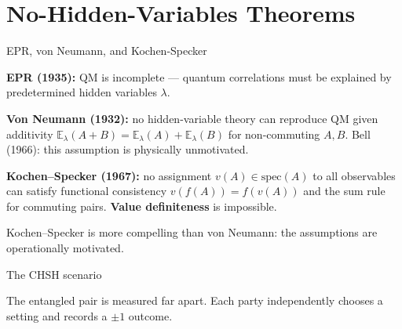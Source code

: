 \documentclass[fleql]{beamer}
\newcommand{\kw}[1]{\textbf{#1}}
\begin{document}
\section{No-Hidden-Variables Theorems}

\begin{frame}{EPR, von Neumann, and Kochen-Specker}

  \textbf{EPR (1935):} QM is incomplete --- quantum correlations
  must be explained by predetermined hidden variables $\lambda$.

  \vspace{0.5em}
  \textbf{Von Neumann (1932):} no hidden-variable theory can
  reproduce QM given additivity $\mathbb{E}_\lambda(A+B) =
  \mathbb{E}_\lambda(A)+\mathbb{E}_\lambda(B)$ for non-commuting
  $A,B$. Bell (1966): this assumption is physically unmotivated.

  \vspace{0.5em}
  \textbf{Kochen--Specker (1967):} no assignment
  $v(A)\in\mathrm{spec}(A)$ to all observables can satisfy
  functional consistency $v(f(A))=f(v(A))$ and the sum rule for
  commuting pairs. \kw{Value definiteness} is impossible.

  \vspace{0.3em}
  \small Kochen--Specker is more compelling than von Neumann: the
  assumptions are operationally motivated.

\end{frame}

\begin{frame}{The CHSH scenario}

\begin{center}
\end{center}

\vspace{0.3em}
\small The entangled pair is measured far apart. Each party
independently chooses a setting and records a $\pm 1$ outcome.

\end{frame}
\end{document}
